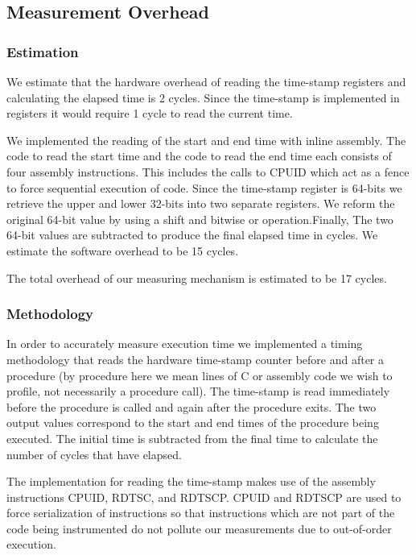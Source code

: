 \subsection{Measurement Overhead}

\subsubsection{Estimation}

We estimate that the hardware overhead of reading the time-stamp registers and
calculating the elapsed time is 2 cycles. Since the time-stamp is implemented in
registers it would require 1 cycle to read the current time. 

We implemented the reading of the start and end time with inline assembly. The
code to read the start time and the code to read the end time each consists of
four assembly instructions. This includes the calls to CPUID which act as a
fence to force sequential execution of code.  Since the time-stamp register is
64-bits we retrieve the upper and lower 32-bits into two separate registers. We
reform the original 64-bit value by using a shift and bitwise or
operation.Finally,  The two 64-bit values are subtracted to produce the final
elapsed time in cycles. We estimate the software overhead to be 15 cycles.

The total overhead of our measuring mechanism is estimated to be 17 cycles.

\subsubsection{Methodology}

In order to accurately measure execution time we implemented a timing
methodology that reads the hardware time-stamp counter before and after a
procedure (by procedure here we mean lines of C or assembly code we wish to
profile, not necessarily a procedure call).  The time-stamp is read immediately
before the procedure is called and again after the procedure exits. The two
output values correspond to the start and end times of the procedure being
executed. The initial time is subtracted from the final time to calculate the
number of cycles that have elapsed.

The implementation for reading the time-stamp makes use of the assembly
instructions CPUID, RDTSC, and RDTSCP. CPUID and RDTSCP are used to force
serialization of instructions so that instructions which are not part of the
code being instrumented do not pollute our measurements due to out-of-order
execution.\cite{intel}

